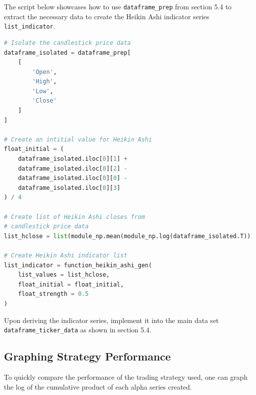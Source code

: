 \documentclass[11pt]{article}
\begin{document}
The script below showcases how to use \texttt{dataframe\_prep} from section 5.4 to extract the necessary data to create the Heikin Ashi indicator series \texttt{list\_indicator}.

\begin{lstlisting}[language=Python]
# Isolate the candlestick price data
dataframe_isolated = dataframe_prep[
    [
        'Open',
        'High',
        'Low',
        'Close'
    ]
]

# Create an intitial value for Heikin Ashi
float_initial = (
    dataframe_isolated.iloc[0][1] + 
    dataframe_isolated.iloc[0][2] - 
    dataframe_isolated.iloc[0][0] - 
    dataframe_isolated.iloc[0][3]
) / 4

# Create list of Heikin Ashi closes from
# candlestick price data
list_hclose = list(module_np.mean(module_np.log(dataframe_isolated.T)))

# Create Heikin Ashi indicator list
list_indicator = function_heikin_ashi_gen(
    list_values = list_hclose,
    float_initial = float_initial,
    float_strength = 0.5
)
\end{lstlisting}

Upon deriving the indicator series, implement it into the main data set \texttt{dataframe\_ticker\_data} as shown in section 5.4.

\subsection{Graphing Strategy Performance}

To quickly compare the performance of the trading strategy used, one can graph the log of the cumulative product of each alpha series created.
\end{document}
